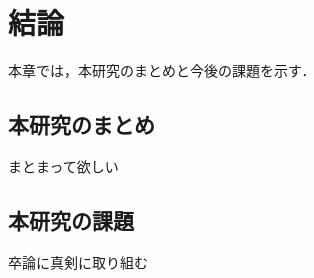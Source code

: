 \chapter{結論}
\label{conclusion}

本章では，本研究のまとめと今後の課題を示す．

\section{本研究のまとめ}

まとまって欲しい

\section{本研究の課題}

卒論に真剣に取り組む

